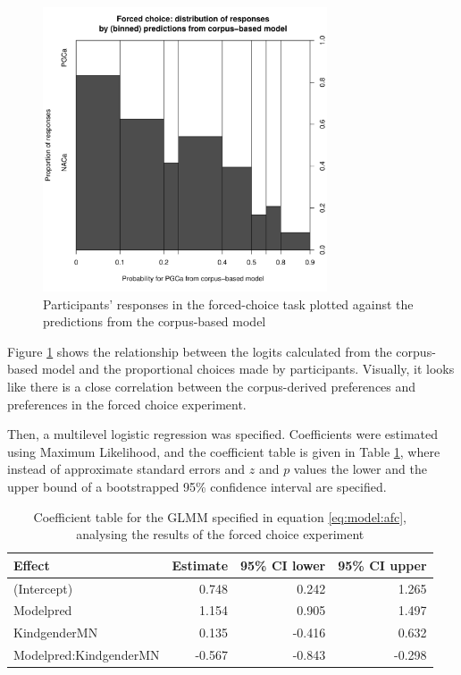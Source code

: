 \documentclass[USenglish]{article}
\begin{document}
\begin{figure}[h]
\centering
\includegraphics[width=0.75\textwidth]{../R/output/fc_proportions}
\caption{Participants' responses in the forced-choice task plotted against the predictions from the corpus-based model}
\label{fig:afc:proportions}
\end{figure}

Figure \ref{fig:afc:proportions} shows the relationship between the logits calculated from the corpus-based model and the proportional choices made by participants.
Visually, it looks like there is a close correlation between the corpus-derived preferences and preferences in the forced choice experiment.

Then, a multilevel logistic regression was specified.
Coefficients were estimated using Maximum Likelihood, and the coefficient table is given in Table \ref{tab:afc:model}, where instead of approximate standard errors and $z$ and $p$ values the lower and the upper bound of a bootstrapped 95\% confidence interval are specified.

\begin{table}
  \centering
  \begin{tabular}{lrrr}
    Effect & Estimate & 95\% CI lower & 95\% CI upper \\
    \midrule
    (Intercept)            &  0.748  &  0.242  &  1.265 \\
    Modelpred              &  1.154  &  0.905  &  1.497 \\
    KindgenderMN           &  0.135  & -0.416  &  0.632 \\
    Modelpred:KindgenderMN & -0.567  & -0.843  & -0.298 \\
  \end{tabular}
  \caption{Coefficient table for the GLMM specified in equation \ref{eq:model:afc}, analysing the results of the forced choice experiment}
  \label{tab:afc:model}
\end{table}
\end{document}
